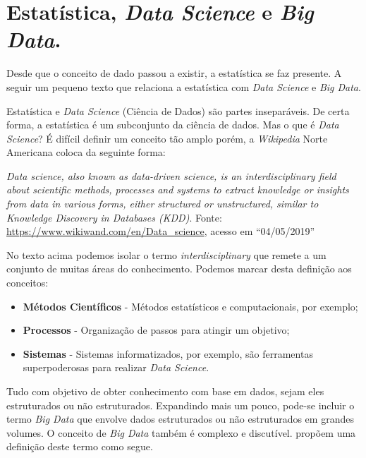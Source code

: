 \documentclass[11pt,]{style/krantz}
\providecommand{\tightlist}{%
  \setlength{\itemsep}{0pt}\setlength{\parskip}{0pt}}
\renewenvironment{quote}{\begin{VF}}{\end{VF}}
\theoremstyle{definition}
\theoremstyle{definition}
\theoremstyle{definition}
\theoremstyle{remark}
\begin{document}
\hypertarget{estatistica-data-science-e-big-data.}{%
\section{\texorpdfstring{Estatística, \emph{Data Science} e \emph{Big Data}.}{Estatística, Data Science e Big Data.}}\label{estatistica-data-science-e-big-data.}}

Desde que o conceito de dado passou a existir, a estatística se faz presente. A seguir um pequeno texto que relaciona a estatística com \emph{Data Science} e \emph{Big Data}.

Estatística e \emph{Data Science} (Ciência de Dados) são partes inseparáveis. De certa forma, a estatística é um subconjunto da ciência de dados. Mas o que é \emph{Data Science}? É difícil definir um conceito tão amplo porém, a \emph{Wikipedia} Norte Americana coloca da seguinte forma:

\begin{quote}
\emph{Data science, also known as data-driven science, is an interdisciplinary field about scientific methods, processes and systems to extract knowledge or insights from data in various forms, either structured or unstructured, similar to Knowledge Discovery in Databases (KDD)}. Fonte: \url{https://www.wikiwand.com/en/Data_science}, acesso em ``04/05/2019''
\end{quote}

No texto acima podemos isolar o termo \emph{interdisciplinary} que remete a um conjunto de muitas áreas do conhecimento. Podemos marcar desta definição aos conceitos:

\begin{itemize}
\tightlist
\item
  \textbf{Métodos Científicos} - Métodos estatísticos e computacionais, por exemplo;
\item
  \textbf{Processos} - Organização de passos para atingir um objetivo;
\item
  \textbf{Sistemas} - Sistemas informatizados, por exemplo, são ferramentas superpoderosas para realizar \emph{Data Science}.
\end{itemize}

Tudo com objetivo de obter conhecimento com base em dados, sejam eles estruturados ou não estruturados. Expandindo mais um pouco, pode-se incluir o termo \emph{Big Data} que envolve dados estruturados ou não estruturados em grandes volumes. O conceito de \emph{Big Data} também é complexo e discutível. \citep{de2016formal} propõem uma definição deste termo como segue.
\end{document}
